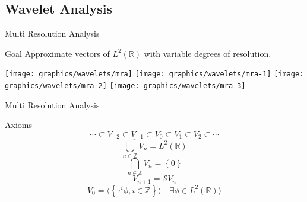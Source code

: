\subsection{Wavelet Analysis}

    \begin{frame}{Multi Resolution Analysis}
        \centering
         {
            \begin{block}{Goal}
                Approximate vectors of $L^2\left(\mathbb{R}\right)$ with variable degrees of resolution.
            \end{block}
        }
         {
            \texttt{[image: graphics/wavelets/mra]}
        }
         {
            \texttt{[image: graphics/wavelets/mra-1]}
        }
         {
            \texttt{[image: graphics/wavelets/mra-2]}
        }
         {
            \texttt{[image: graphics/wavelets/mra-3]}
        }
    \end{frame}

    \begin{frame}{Multi Resolution Analysis}
        \begin{block}{Axioms}
            \begin{equation}
                \cdots \subset V_{-2} \subset V_{-1} \subset V_0 \subset V_1 \subset V_2 \subset \cdots
            \end{equation}
            \begin{equation}
                \overline{\bigcup\limits_{n \in \mathbb{Z}} V_n} = L^2\left(\mathbb{R}\right)
            \end{equation}
            \begin{equation}
                \bigcap\limits_{n \in \mathbb{Z}} V_n = \left\{0\right\}
            \end{equation}
            \begin{equation}
                V_{n+1} = \mathcal{S}V_n
            \end{equation}
            \begin{equation}
                V_0 = \langle \left\{\tau^i\phi, i \in \mathbb{Z}\right\} \rangle \quad \exists \phi \in L^2\left(\mathbb{R}\right)\rangle
            \end{equation}
        \end{block}
    \end{frame}

